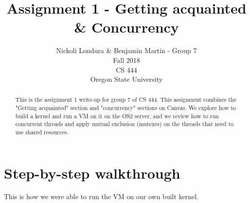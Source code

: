 \documentclass[10pt,english]{article}
\title{Assignment 1 - Getting acquainted \& Concurrency}
\author{Nickoli Londura \& Benjamin Martin - Group 7 \\ Fall 2018 \\ CS 444 \\ Oregon State University}
\begin{document}
\maketitle

\begin{abstract}

\noindent This is the assignment 1 write-up for group 7 of CS 444. This assignment combines the "Getting acquainted" section and "concurrency" sections on Canvas. We explore how to build a kernel and run a VM on it on the OS2 server, and we review how to run concurrent threads and apply mutual exclusion (mutexes) on the threads that need to use shared resources.

\end{abstract}

\newpage


\section{Step-by-step walkthrough}
\par This is how we were able to run the VM on our own built kernel.
\end{document}
